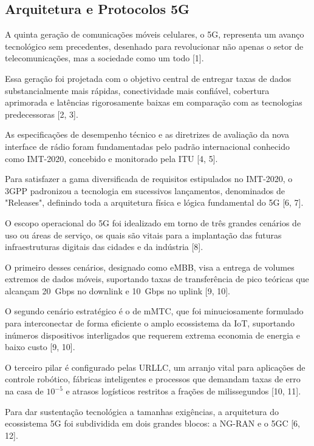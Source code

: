 \subsection*{Arquitetura e Protocolos 5G}
A quinta geração de comunicações móveis celulares, o \gls{5G}, representa um avanço tecnológico sem precedentes, desenhado para revolucionar não apenas o setor de telecomunicações, mas a sociedade como um todo [1].

Essa geração foi projetada com o objetivo central de entregar taxas de dados substancialmente mais rápidas, conectividade mais confiável, cobertura aprimorada e latências rigorosamente baixas em comparação com as tecnologias predecessoras [2, 3].

As especificações de desempenho técnico e as diretrizes de avaliação da nova interface de rádio foram fundamentadas pelo padrão internacional conhecido como IMT-2020, concebido e monitorado pela \gls{ITU} [4, 5].

Para satisfazer a gama diversificada de requisitos estipulados no IMT-2020, o \gls{3GPP} padronizou a tecnologia em sucessivos lançamentos, denominados de "Releases", definindo toda a arquitetura física e lógica fundamental do \gls{5G} [6, 7].

O escopo operacional do \gls{5G} foi idealizado em torno de três grandes cenários de uso ou áreas de serviço, os quais são vitais para a implantação das futuras infraestruturas digitais das cidades e da indústria [8].

O primeiro desses cenários, designado como \gls{eMBB}, visa a entrega de volumes extremos de dados móveis, suportando taxas de transferência de pico teóricas que alcançam 20~Gbps no downlink e 10~Gbps no uplink [9, 10].

O segundo cenário estratégico é o de \gls{mMTC}, que foi minuciosamente formulado para interconectar de forma eficiente o amplo ecossistema da \gls{IoT}, suportando inúmeros dispositivos interligados que requerem extrema economia de energia e baixo custo [9, 10].

O terceiro pilar é configurado pelas \gls{URLLC}, um arranjo vital para aplicações de controle robótico, fábricas inteligentes e processos que demandam taxas de erro na casa de $10^{-5}$ e atrasos logísticos restritos a frações de milissegundos [10, 11].

Para dar sustentação tecnológica a tamanhas exigências, a arquitetura do ecossistema \gls{5G} foi subdividida em dois grandes blocos: a \gls{NG-RAN} e o \gls{5GC} [6, 12].


